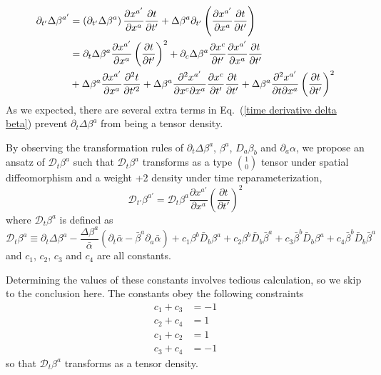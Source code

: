 \documentclass[letterpaper,nofootinbib,prd,amsmath,onecolumn]{revtex4-1}
\begin{document}
\begin{align}\label{time derivative delta beta} 
\partial_{t'}\Delta \beta^{a'} & = \left(\partial_{t'}\Delta \beta^{a}\right)\frac{\partial x^{a'}}{\partial x^{a}}\frac{\partial t}{\partial t'} + \Delta \beta^{a}\partial_{t'}\left(\frac{\partial x^{a'}}{\partial x^{a}}\frac{\partial t}{\partial t'}\right)\notag\\
& = \partial_{t}\Delta \beta^{a}\frac{\partial x^{a'}}{\partial x^{a}}\left(\frac{\partial t}{\partial t'}\right)^{2} + \partial_{c}\Delta \beta^{a}\frac{\partial x^{c}}{\partial t'}\frac{\partial x^{a'}}{\partial x^{a}}\frac{\partial t}{\partial t'}\notag\\
& + \Delta \beta^{a}\frac{\partial x^{a'}}{\partial x^{a}}\frac{\partial^{2}t}{\partial t'^{2}} + \Delta \beta^{a}\frac{\partial^{2} x^{a'}}{\partial x^{c}\partial x^{a}}\frac{\partial x^{c}}{\partial t'}\frac{\partial t}{\partial t'} + \Delta \beta^{a}\frac{\partial^{2}x^{a'}}{\partial t\partial x^{a}}\left(\frac{\partial t}{\partial t'}\right)^{2}
\end{align}
As we expected, there are several extra terms in Eq.~(\ref{time derivative delta beta}) prevent $\partial_{t}\Delta\beta^{a}$ from being a tensor density. 

By observing the transformation rules of $\partial_{t}\Delta\beta^{a}$, $\beta^{a}$, $D_{a}\beta_{b}$ and $\partial_{a}\alpha$, we propose an ansatz of $\mathscr{D}_{t}\beta^{a}$ such that $\mathscr{D}_{t}\beta^{a}$ transforms as a type $1 \choose 0$ tensor under spatial diffeomorphism and a weight +2 density under time reparameterization, 
\begin{equation}
\mathscr{D}_{t'}\beta^{a'} = \mathscr{D}_{t}\beta^{a}\frac{\partial x^{a'}}{\partial x^{a}}\left(\frac{\partial t}{\partial t'}\right)^{2}
\end{equation}
where $\mathscr{D}_{t}\beta^{a}$ is defined as
\begin{equation}
\mathscr{D}_{t}\beta^{a} \equiv \partial_{t}\Delta \beta^{a} - \frac{\Delta \beta^{a}}{{\bar \alpha}}\left(\partial_{t}{\bar \alpha} - {\bar \beta}^{a}\partial_{a}{\bar \alpha}\right) + c_{1}\beta^{b}{\bar D}_{b}\beta^{a} + c_{2}\beta^{b}{\bar D}_{b}{\bar \beta}^{a} + c_{3}{\bar \beta}^{b}{\bar D}_{b}\beta^{a} + c_{4}{\bar \beta}^{b}{\bar D}_{b}{\bar \beta}^{a}
\end{equation}
and $c_{1}$, $c_{2}$, $c_{3}$ and $c_{4}$ are all constants. 

Determining the values of these constants involves tedious calculation, so we skip to the conclusion here. The constants obey the following constraints
\begin{align*}
c_{1} + c_{3} & = -1\\
c_{2} + c_{4} & = 1\\
c_{1} + c_{2} & = 1\\
c_{3} + c_{4} & = -1 
\end{align*}
so that $\mathscr{D}_{t} \beta^{a}$ transforms as a tensor density. 
\end{document}
